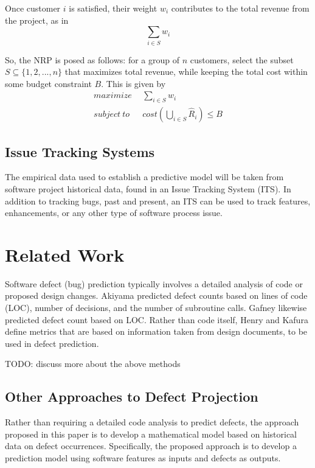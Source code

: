 \documentclass[a4paper]{scrartcl}
\begin{document}
Once customer $i$ is satisfied, their weight $w_i$ contributes to the total revenue from the project, as in
\begin{equation}
\sum_{i \in S} w_i
\end{equation}

So, the NRP is posed as follows: for a group of $n$ customers, select the subset $S \subseteq \{ 1,2,...,n \}$ that maximizes total revenue, while keeping the total cost within some budget constraint $B$. This is given by 
\begin{equation}
\begin{split}
maximize~~& \sum_{i \in S} w_i \\
subject~to~~~& cost(\bigcup_{i \in S} \hat{R}_i) \le B
\end{split}
\end{equation}

\subsection{Issue Tracking Systems}
The empirical data used to establish a predictive model will be taken from software project historical data, found in an Issue Tracking System (ITS). In addition to tracking bugs, past and present, an ITS can be used to track features, enhancements, or any other type of software process issue. 

\section{Related Work}
\label{sec:related_work}

Software defect (bug) prediction typically involves a detailed analysis of code or proposed design changes. Akiyama \cite{1971_akiyama} predicted defect counts based on lines of code (LOC), number of decisions, and the number of subroutine calls. Gafney \cite{1984_gaffney_estimating} likewise predicted defect count based on LOC. Rather than code itself, Henry and Kafura \cite{1984_henry_evaluation} define metrics that are based on information taken from design documents, to be used in defect prediction.

TODO: discuss more about the above methods

\subsection{Other Approaches to Defect Projection}
Rather than requiring a detailed code analysis to predict defects, the approach proposed in this paper is to develop a mathematical model based on historical data on defect occurrences. Specifically, the proposed approach is to develop a prediction model using software features as inputs and defects as outputs.
\end{document}
